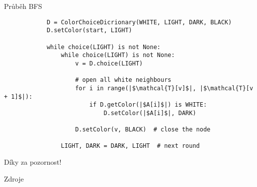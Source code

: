 \documentclass{beamer}
\begin{document}
	\begin{frame}[fragile]{Průběh BFS}
		\small
		\begin{verbatim}
			D = ColorChoiceDicrionary(WHITE, LIGHT, DARK, BLACK)
			D.setColor(start, LIGHT)

			while choice(LIGHT) is not None:
				while choice(LIGHT) is not None:
					v = D.choice(LIGHT)

					# open all white neighbours
					for i in range(|$\mathcal{T}[v]$|, |$\mathcal{T}[v + 1]$|):
						if D.getColor(|$A[i]$|) is WHITE:
							D.setColor(|$A[i]$|, DARK)

					D.setColor(v, BLACK)  # close the node

				LIGHT, DARK = DARK, LIGHT  # next round
		\end{verbatim}
	\end{frame}

	\begin{frame}[focus]
		Díky za pozornost!
	\end{frame}
	
	\appendix
	\begin{frame}{Zdroje}
		\nocite{*}
		
		
	\end{frame}
\end{document}
